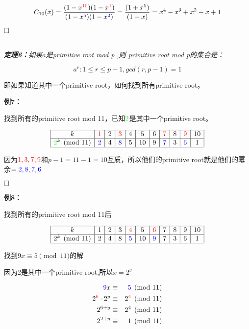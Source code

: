 \documentclass{article}
\begin{document}
$$C_{10}(x) =\frac{(1-x^{{\color{red}10}})(1-x^{{\color{red}1}})}{(1-x^{{\color{blue}5}})(1-x^{{\color{blue}2}})} = \frac{(1+x^{5})}{(1+x)} =x^4-x^3+x^2-x+1$$



$\hfill\square$ 

~\\

\textit{\textbf{定理6：}如果$a$是{\color{red}primitive root mod p} ,则 {\color{red}primitive root mod p}的集合是：}

$${a^r :1 \leq  r \leq p-1, gcd(r,p-1) = 1}$$

即如果知道其中一个primitive root，如何找到所有primitive root。

\textbf{例7：}


找到所有的primitive root mod 11，已知${\color{green}2}$是其中一个primitive root。

$$
\begin{array}{|c|c|c|c|c|c|c|c|c|c|c|}
\hline 
k & {\color{red}1}&2 &{\color{red}3} &4 &5 &6 &{\color{red}7} &8 &{\color{red}9}&10 \\
\hline 
{\color{green}2}^k \pmod{11} &{\color{blue}2}&4&{\color{blue}8}&5&10&9&{\color{blue}7}&3&{\color{blue}6}&1\\
\hline 
\end{array}
$$

因为${\color{red}{1,3,7,9}}$和$p-1 = 11 -1 = 10 $互质，所以他们的primitive root就是他们的幂余$= {\color{blue}{2,8,7,6}}$

$\hfill\square$

\textbf{例8：}


找到所有的primitive root mod 11后

$$
\begin{array}{|c|c|c|c|c|c|c|c|c|c|c|}
\hline 
k & 1&2 &3&{\color{red}4} &5 &{\color{red}6} &7 &8 &9&10 \\
\hline 
2^k \pmod{11} &2&4&8&{\color{blue}5}&10&{\color{blue}9}&7&3&6&1\\
\hline 
\end{array}
$$

找到$9x \equiv 5 \pmod{11}$的解

因为2是其中一个primitive root,所以$x=2^y$

\begin{eqnarray}   
\label{eq}
{\color{blue}9}x  &\equiv& {\color{blue}5} \pmod{11} \nonumber \\
2^{{\color{red}6}} \cdot 2^y &\equiv& 2^{{\color{red}4}} \pmod{11}\nonumber \\
2^{6+y} &\equiv& 2^4 \pmod{11}\nonumber \\
2^{2+y} &\equiv& 1 \pmod{11}\nonumber \\
\nonumber 
\end{eqnarray}
\end{document}
